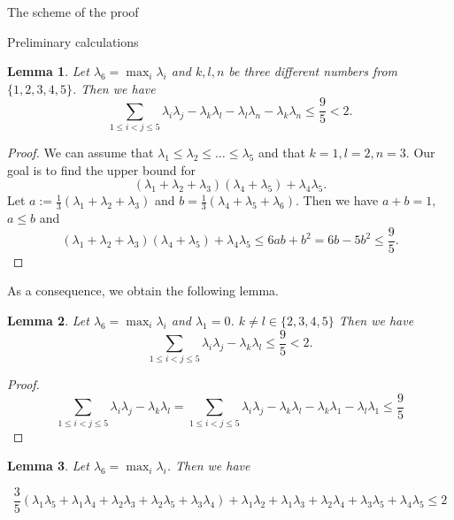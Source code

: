 \documentclass[12pt]{article}
\newtheorem{lemma}{Lemma}[section]
\begin{document}
\begin{section}{The scheme of the proof}
\begin{section}{Preliminary calculations}
    \begin{lemma}
    \label{lemma3.4}
        Let $\lambda_{6} = \max_{i}\lambda_{i}$ and $k,l,n$ be three different  numbers from $\{1,2,3,4,5\}$. Then we have 
        $$
            \sum_{1\leq i<j\leq 5}\lambda_{i}\lambda_{j} - \lambda_{k}\lambda_{l} - \lambda_{l}\lambda_{n} - \lambda_{k}\lambda_{n}\leq \frac{9}{5} < 2.
        $$
    \end{lemma}
    
    \begin{proof}
        We can assume that $\lambda_{1}\leq \lambda_{2}\leq \ldots \leq \lambda_{5}$ and that $k=1, l=2, n=3$. Our goal is to find the upper bound for 
        $$          (\lambda_{1}+\lambda_{2}+\lambda_{3})(\lambda_{4}+\lambda_{5}) + \lambda_{4}\lambda_{5}.
        $$
        Let $a := \frac{1}{3}(\lambda_{1} + \lambda_{2} + \lambda_{3})$ and $b = \frac{1}{3}(\lambda_{4} + \lambda_{5} + \lambda_{6})$. Then we have $a + b = 1 ,$ $a\leq b$ and 
        $$
            (\lambda_{1}+\lambda_{2}+\lambda_{3})(\lambda_{4}+\lambda_{5}) + \lambda_{4}\lambda_{5} \leq 6ab + b^2 = 6b - 5b^2 \leq \frac{9}{5}.
        $$
       
        
    \end{proof}
    As a consequence, we obtain the following lemma. 
     \begin{lemma}
    \label{lemma3.5}
         Let $\lambda_{6} = \max_{i}\lambda_{i}$ and $\lambda_{1}=0$. $k\neq l \in \{2,3,4,5\}$ Then we have 
         $$
            \sum_{1\leq i<j\leq 5}\lambda_{i}\lambda_{j}  - \lambda_{k}\lambda_{l} \leq \frac{9}{5} 
 < 2.
         $$
    \end{lemma}

    \begin{proof}
          $$
            \sum_{1\leq i<j\leq 5}\lambda_{i}\lambda_{j}  - \lambda_{k}\lambda_{l} = \sum_{1\leq i<j\leq 5}\lambda_{i}\lambda_{j}  - \lambda_{k}\lambda_{l} - \lambda_{k}\lambda_{1} - \lambda_{l} \lambda_{1}  \leq \frac{9}{5} 
         $$
    \end{proof}

    \begin{lemma}
    \label{lemma3.6}
         Let $\lambda_{6} = \max_{i}\lambda_{i}$. Then we have
         
        $$
           \frac{3}{5}(\lambda_{1}\lambda_{5} + \lambda_{1}\lambda_{4} +\lambda_{2}\lambda_{3} + \lambda_{2}\lambda_{5} + \lambda_{3}\lambda_{4} ) + \lambda_{1}\lambda_{2} + \lambda_{1}\lambda_{3} + \lambda_{2}\lambda_{4} +\lambda_{3}\lambda_{5} + \lambda_{4}\lambda_{5} \leq 2
        $$
    \end{lemma}


\end{section}
\end{section}
\end{document}
